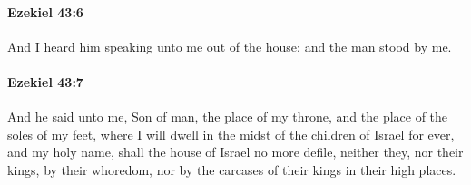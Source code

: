 		\paragraph{Ezekiel 43:6} %
			\label{EZEKIEL-43-6}

			And I heard him speaking unto me out of the house; and the man stood by me.


		\paragraph{Ezekiel 43:7} %
			\label{EZEKIEL-43-7}

			And he said unto me, Son of man, the place of my throne, and the place of the soles of my feet, where I will dwell in the midst of the children of Israel for ever, and my holy name, shall the house of Israel no more defile, neither they, nor their kings, by their whoredom, nor by the carcases of their kings in their high places.

